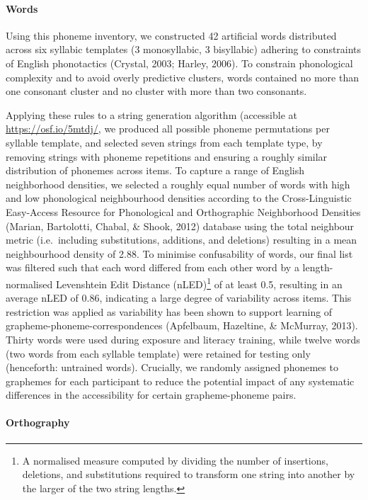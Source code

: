 \documentclass[doc,floatsintext]{apa6}
\let\oldparagraph\paragraph
\renewcommand{\paragraph}[1]{\oldparagraph{#1}\mbox{}}
\let\rmarkdownfootnote\footnote%
\def\footnote{\protect\rmarkdownfootnote}
\begin{document}
\paragraph{Words}\label{words}

Using this phoneme inventory, we constructed 42 artificial words
distributed across six syllabic templates (3 monosyllabic, 3 bisyllabic)
adhering to constraints of English phonotactics (Crystal, 2003; Harley,
2006). To constrain phonological complexity and to avoid overly
predictive clusters, words contained no more than one consonant cluster
and no cluster with more than two consonants.

Applying these rules to a string generation algorithm (accessible at
\url{https://osf.io/5mtdj/}, we produced all possible phoneme
permutations per syllable template, and selected seven strings from each
template type, by removing strings with phoneme repetitions and ensuring
a roughly similar distribution of phonemes across items. To capture a
range of English neighborhood densities, we selected a roughly equal
number of words with high and low phonological neighbourhood densities
according to the Cross-Linguistic Easy-Access Resource for Phonological
and Orthographic Neighborhood Densities (Marian, Bartolotti, Chabal, \&
Shook, 2012) database using the total neighbour metric (i.e.~including
substitutions, additions, and deletions) resulting in a mean
neighbourhood density of 2.88. To minimise confusability of words, our
final list was filtered such that each word differed from each other
word by a length-normalised Levenshtein Edit Distance (nLED)\footnote{A
  normalised measure computed by dividing the number of insertions,
  deletions, and substitutions required to transform one string into
  another by the larger of the two string lengths.} of at least 0.5,
resulting in an average nLED of 0.86, indicating a large degree of
variability across items. This restriction was applied as variability
has been shown to support learning of grapheme-phoneme-correspondences
(Apfelbaum, Hazeltine, \& McMurray, 2013). Thirty words were used during
exposure and literacy training, while twelve words (two words from each
syllable template) were retained for testing only (henceforth: untrained
words). Crucially, we randomly assigned phonemes to graphemes for each
participant to reduce the potential impact of any systematic differences
in the accessibility for certain grapheme-phoneme pairs.

\paragraph{Orthography}\label{orthography}
\end{document}
